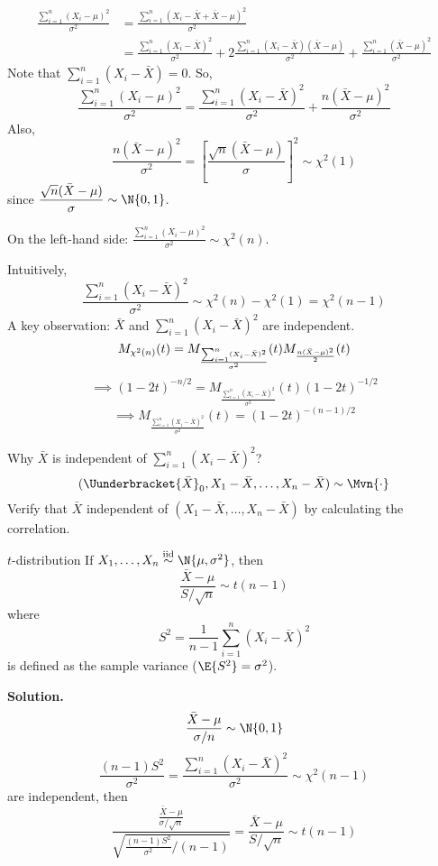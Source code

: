 \begin{Proof}{}{}
    \begin{align*}
        \frac{\sum_{i=1}^{n} (X_i-\mu)^2}{\sigma^2}
         & =\frac{\sum_{i=1}^{n} (X_i-\bar{X}+\bar{X}-\mu)^2}{\sigma^2} \\
         & =\frac{\sum_{i=1}^{n} (X_i-\bar{X})^2}{\sigma^2}+2
        \frac{\sum_{i=1}^{n} (X_i-\bar{X})(\bar{X}-\mu)}{\sigma^2}+
        \frac{\sum_{i=1}^{n} (\bar{X}-\mu)^2}{\sigma^2}
    \end{align*}
    Note that $ \sum_{i=1}^{n} (X_i-\bar{X})=0 $. So,
    \[ \frac{\sum_{i=1}^{n} (X_i-\mu)^2}{\sigma^2}=
        \frac{\sum_{i=1}^{n} (X_i-\bar{X})^2}{\sigma^2}+
        \frac{n(\bar{X}-\mu)^2}{\sigma^2} \]
    Also,
    \[ \frac{n(\bar{X}-\mu)^2}{\sigma^2}=
        \left[ \frac{\sqrt{n}(\bar{X}-\mu)}{\sigma} \right]^2 \sim \chi^2(1)  \]
    since $ \displaystyle \frac{\sqrt{n}(\bar{X}-\mu)}{\sigma} \sim \N{0,1} $.

    On the left-hand side: $ \displaystyle  \frac{\sum_{i=1}^{n} (X_i-\mu)^2}{\sigma^2}\sim \chi^2(n) $.

    Intuitively,
    \[ \frac{\sum_{i=1}^{n}(X_i-\bar{X})^2}{\sigma^2}\sim \chi^2(n)-\chi^2(1)=\chi^2(n-1)  \]
    A key observation: $ \bar{X} $ and $ \sum_{i=1}^{n} (X_i-\bar{X})^2 $
    are independent.
    \[
        M_{\chi^2(n)}(t)=M_{\frac{\sum_{i=1}^{n} (X_i-\bar{X})^2}{\sigma^2}}(t)
        M_{\frac{n(\bar{X}-\mu)^2}{2}}(t)\\
    \]
    \[ \implies (1-2t)^{-n/2}=M_{\frac{\sum_{i=1}^{n} (X_i-\bar{X})^2}{\sigma^2}}(t)
        (1-2t)^{-1/2} \]
    \[ \implies M_{\frac{\sum_{i=1}^{n} (X_i-\bar{X})^2}{\sigma^2}}(t)=(1-2t)^{-(n-1)/2}  \]
\end{Proof}
Why $ \bar{X} $ is independent of $ \sum_{i=1}^{n} (X_i-\bar{X})^2 $?
\[ (\Uunderbracket{\bar{X}}_{0},X_1-\bar{X},\ldots,X_n-\bar{X})\sim \Mvn{\cdot} \]
Verify that $ \bar{X} $ independent of $ (X_1-\bar{X},\ldots,X_n-\bar{X}) $
by calculating the correlation.
\begin{Example}{$ t $-distribution}{}
    If $ X_1,\ldots,X_n \stackrel{\text{iid}}{\sim}\N{\mu,\sigma^2} $,
    then
    \[ \frac{\bar{X}-\mu}{S/\sqrt{n}}\sim t(n-1)  \]
    where
    \[ S^2=\frac{1}{n-1} \sum_{i=1}^{n} (X_i-\bar{X})^2 \]
    is defined as the sample variance ($ \E{S^2}=\sigma^2 $).

    \textbf{Solution.}
    \[ \frac{\bar{X}-\mu}{\sigma/n}\sim \N{0,1}  \]
    \[ \frac{(n-1)S^2}{\sigma^2}=\frac{\sum_{i=1}^{n} (X_i-\bar{X})^2}{\sigma^2}
        \sim \chi^2(n-1)   \]
    are independent, then
    \[ \frac{\displaystyle \frac{\bar{X}-\mu}{\sigma/\sqrt{n}}}{
            \displaystyle \sqrt{\frac{(n-1)S^2}{\sigma^2}/(n-1)}
        } =\frac{\bar{X}-\mu}{S/\sqrt{n}} \sim t(n-1) \]
\end{Example}
